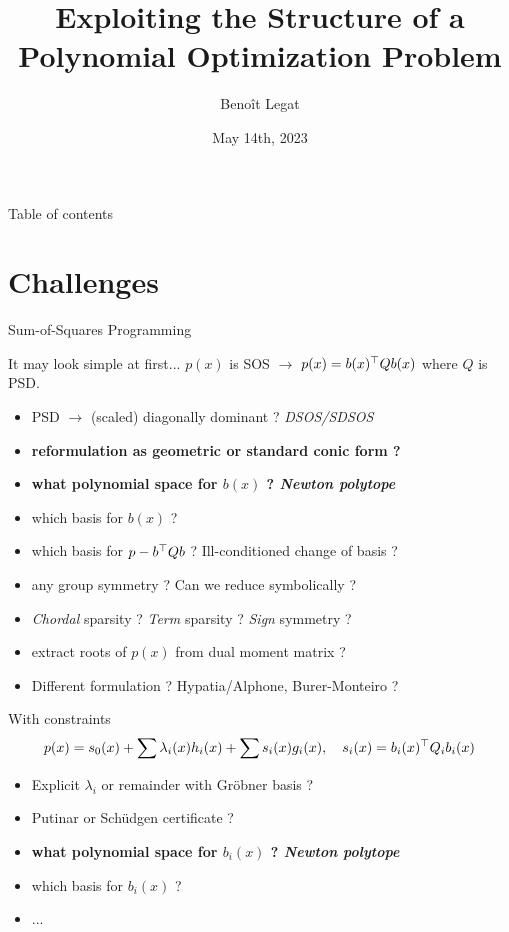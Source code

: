 \documentclass{beamer}
\title{Exploiting the Structure of a Polynomial Optimization Problem}
\date{May 14th, 2023}
\author{Beno\^it Legat}
\institute{SIAM Dynamical Systems 2023}
\begin{document}
  \maketitle

\begin{frame}{Table of contents}
    \tableofcontents
\end{frame}

\section{Challenges}

\begin{frame}{Sum-of-Squares Programming}
    \begin{block}{It may look simple at first...}
        $p(x)$ is SOS $\to$
        $p(x) = b(x)^\top Q b(x)$
        where $Q$ is PSD.
    \end{block}
    \begin{itemize}
      \item PSD $\to$ (scaled) diagonally dominant ? \emph{DSOS/SDSOS}
      \item \textbf{reformulation as geometric or standard conic form ?}
      \item \textbf{what polynomial space for $b(x)$ ? \emph{Newton polytope}}
      \item which basis for $b(x)$ ?
      \item which basis for $p - b^\top Q b$ ? \alert{Ill-conditioned} change of basis ?
      \item any group symmetry ? Can we reduce \alert{symbolically} ?
      \item \emph{Chordal} sparsity ? \emph{Term} sparsity ? \emph{Sign} symmetry ?
      \item extract roots of $p(x)$ from dual \alert{moment matrix} ?
      \item Different formulation ? \alert{Hypatia}/\alert{Alphone}, Burer-Monteiro ?
    \end{itemize}
\end{frame}

\begin{frame}{With constraints}
    $$p(x) = s_0(x) + \sum \lambda_i(x) h_i(x) + \sum s_i(x) g_i(x), \quad s_i(x) = b_i(x)^\top Q_i b_i(x)$$
    \begin{itemize}
      \item Explicit $\lambda_i$ or remainder with Gr\"{o}bner basis ?
      \item Putinar or Sch\"{u}dgen certificate ?
      \item \textbf{what polynomial space for $b_i(x)$ ? \emph{Newton polytope}}
      \item which basis for $b_i(x)$ ?
      \item ...
    \end{itemize}
\end{frame}
\end{document}
